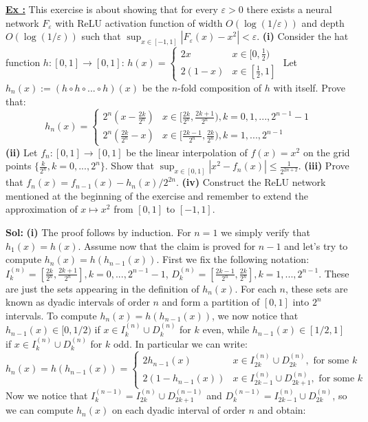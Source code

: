 \documentclass[a4paper,10pt]{article}
\newcounter{exerciseCounter}
\newcommand{\exercise}[1]{%
    \vspace{1mm}
    \stepcounter{exerciseCounter}%
    \color{exerciseBlack}
    \textbf{\underline{Ex \theexerciseCounter:}} #1
}
\newcommand{\solution}[1]{%
    {\color{solutionGray} \textbf{Sol: } #1} %
}
\begin{document}
\begin{scriptsize}
\exercise{This exercise is about showing that for every $\varepsilon > 0$ there exists a neural network $F_\varepsilon$ with ReLU activation function of width $O(\log(1/\varepsilon))$ and depth $O(\log(1/\varepsilon))$ such that
$\sup_{x \in [-1,1]} |F_\varepsilon(x) - x^2| < \varepsilon$.
\textbf{(i)} Consider the hat function $h: [0,1] \to [0,1]$:
$h(x) = \begin{cases} 2x & x \in [0,\frac{1}{2}) \\ 2(1-x) & x \in [\frac{1}{2},1] \end{cases}$
Let $h_n(x) := (h \circ h \circ ... \circ h)(x)$ be the $n$-fold composition of $h$ with itself. Prove that:
$$h_n(x) = \begin{cases} 2^n(x-\frac{2k}{2^n}) & x \in [\frac{2k}{2^n},\frac{2k+1}{2^n}), k=0,1,...,2^{n-1}-1 \\ 2^n(\frac{2k}{2^n}-x) & x \in [\frac{2k-1}{2^n},\frac{2k}{2^n}), k=1,...,2^{n-1} \end{cases}$$
\textbf{(ii)} Let $f_n: [0,1] \to [0,1]$ be the linear interpolation of $f(x)=x^2$ on the grid points $\{\frac{k}{2^n}, k=0,...,2^n\}$. Show that
$\sup_{x \in [0,1]} |x^2 - f_n(x)| \leq \frac{1}{2^{2n+2}}$.
\textbf{(iii)} Prove that $f_n(x) = f_{n-1}(x) - h_n(x)/2^{2n}$.
\textbf{(iv)} Construct the ReLU network mentioned at the beginning of the exercise and remember to extend the approximation of $x \mapsto x^2$ from $[0,1]$ to $[-1,1]$.}
\solution{\textbf{(i)} The proof follows by induction. For $n=1$ we simply verify that $h_1(x) = h(x)$.
Assume now that the claim is proved for $n-1$ and let's try to compute $h_n(x) = h(h_{n-1}(x))$.
First we fix the following notation:
$I_k^{(n)} = [\frac{2k}{2^n},\frac{2k+1}{2^n}], k=0,...,2^{n-1}-1$, $D_k^{(n)} = [\frac{2k-1}{2^n},\frac{2k}{2^n}], k=1,...,2^{n-1}$.
These are just the sets appearing in the definition of $h_n(x)$. For each $n$, these sets are known as dyadic intervals of order $n$ and form a partition of $[0,1]$ into $2^n$ intervals.
To compute $h_n(x) = h(h_{n-1}(x))$, we now notice that $h_{n-1}(x) \in [0,1/2)$ if $x \in I_k^{(n)} \cup D_k^{(n)}$ for $k$ even, while $h_{n-1}(x) \in [1/2,1]$ if $x \in I_k^{(n)} \cup D_k^{(n)}$ for $k$ odd. In particular we can write:
$h_n(x) = h(h_{n-1}(x)) = \begin{cases} 2h_{n-1}(x) & x \in I_{2k}^{(n)} \cup D_{2k}^{(n)}, \text{ for some } k \\ 2(1-h_{n-1}(x)) & x \in I_{2k-1}^{(n)} \cup D_{2k+1}^{(n)}, \text{ for some } k \end{cases}$
Now we notice that $I_k^{(n-1)} = I_{2k}^{(n)} \cup D_{2k+1}^{(n-1)}$ and $D_k^{(n-1)} = I_{2k-1}^{(n)} \cup D_{2k}^{(n)}$, so we can compute $h_n(x)$ on each dyadic interval of order $n$ and obtain:
}
\end{scriptsize}
\end{document}
